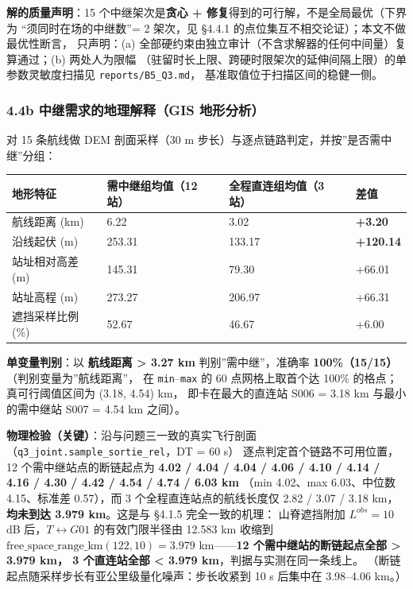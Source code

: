 \documentclass[
  10.5pt,
]{article}
\newcounter{none} %
\begin{document}
\textbf{解的质量声明}：15 个中继架次是\textbf{贪心 +
修复}得到的可行解，不是全局最优（下界为 ``须同时在场的中继数''= 2
架次，见 §4.4.1 的点位集互不相交论证）；本文不做最优性断言， 只声明：(a)
全部硬约束由独立审计（不含求解器的任何中间量）复算通过；(b) 两处人为限幅
（驻留时长上限、跨硬时限架次的延伸间隔上限）的单参数灵敏度扫描见
\texttt{reports/B5\_Q3.md}， 基准取值位于扫描区间的稳健一侧。

\subsubsection{4.4b 中继需求的地理解释（GIS
地形分析）}\label{b-ux4e2dux7ee7ux9700ux6c42ux7684ux5730ux7406ux89e3ux91cagis-ux5730ux5f62ux5206ux6790}

对 15 条航线做 DEM 剖面采样（30 m
步长）与逐点链路判定，并按''是否需中继''分组：

{\def\LTcaptype{none} %
\begin{longtable}[]{@{}llll@{}}
\toprule\noalign{}
地形特征 & 需中继组均值（12 站） & 全程直连组均值（3 站） & 差值 \\
\midrule\noalign{}
\endhead
\bottomrule\noalign{}
\endlastfoot
航线距离 (km) & 6.22 & 3.02 & \textbf{+3.20} \\
沿线起伏 (m) & 253.31 & 133.17 & \textbf{+120.14} \\
站址相对高差 (m) & 145.31 & 79.30 & +66.01 \\
站址高程 (m) & 273.27 & 206.97 & +66.31 \\
遮挡采样比例 (\%) & 52.67 & 46.67 & +6.00 \\
\end{longtable}
}

\textbf{单变量判别}：以 \textbf{航线距离 \textgreater{} 3.27 km}
判别''需中继''，准确率 \textbf{100\%（15/15）}（判别变量为''航线距离''，
在 \texttt{min}--\texttt{max} 的 60 点网格上取首个达 100\%
的格点；真可行阈值区间为 (3.18, 4.54) km， 即卡在最大的直连站 S006 =
3.18 km 与最小的需中继站 S007 = 4.54 km 之间）。

\textbf{物理检验（关键）}：沿与问题三一致的真实飞行剖面（\texttt{q3\_joint.sample\_sortie\_rel}，DT
= 60 s） 逐点判定首个链路不可用位置，12 个需中继站点的断链起点为
\textbf{4.02 / 4.04 / 4.04 / 4.06 / 4.10 / 4.14 / 4.16 / 4.30 / 4.42 /
4.54 / 4.74 / 6.03 km} （min 4.02、max 6.03、中位数 4.15、标准差
0.57），而 3 个全程直连站点的航线长度仅 2.82 / 3.07 / 3.18
km，\textbf{均未到达 3.979 km}。这是与 §4.1.5 完全一致的机理：
山脊遮挡附加 \(L^{obs}=10\) dB 后，\(T\leftrightarrow G01\)
的有效门限半径由 12.583 km 收缩到
\(\text{free\_space\_range\_km}(122, 10)=3.979\) km------\textbf{12
个需中继站的断链起点全部 \textgreater{} 3.979 km， 3 个直连站全部
\textless{} 3.979 km}，判据与实测在同一条线上。
（断链起点随采样步长有亚公里级量化噪声：步长收紧到 10 s 后集中在
3.98--4.06 km。）
\end{document}
